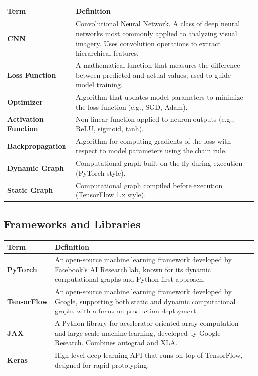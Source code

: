\documentclass[11pt]{article}
\begin{document}
\begin{longtable}{|p{}|p{}|}
\hline
\textbf{Term} & \textbf{Definition} \\
\hline
\endhead
\textbf{CNN} & Convolutional Neural Network. A class of deep neural networks most commonly applied to analyzing visual imagery. Uses convolution operations to extract hierarchical features. \\
\hline
\textbf{Loss Function} & A mathematical function that measures the difference between predicted and actual values, used to guide model training. \\
\hline
\textbf{Optimizer} & Algorithm that updates model parameters to minimize the loss function (e.g., SGD, Adam). \\
\hline
\textbf{Activation Function} & Non-linear function applied to neuron outputs (e.g., ReLU, sigmoid, tanh). \\
\hline
\textbf{Backpropagation} & Algorithm for computing gradients of the loss with respect to model parameters using the chain rule. \\
\hline
\textbf{Dynamic Graph} & Computational graph built on-the-fly during execution (PyTorch style). \\
\hline
\textbf{Static Graph} & Computational graph compiled before execution (TensorFlow 1.x style). \\
\hline
\end{longtable}

\subsection{Frameworks and Libraries}

\begin{longtable}{|p{}|p{}|}
\hline
\textbf{Term} & \textbf{Definition} \\
\hline
\endhead
\textbf{PyTorch} & An open-source machine learning framework developed by Facebook's AI Research lab, known for its dynamic computational graphs and Python-first approach. \\
\hline
\textbf{TensorFlow} & An open-source machine learning framework developed by Google, supporting both static and dynamic computational graphs with a focus on production deployment. \\
\hline
\textbf{JAX} & A Python library for accelerator-oriented array computation and large-scale machine learning, developed by Google Research. Combines autograd and XLA. \\
\hline
\textbf{Keras} & High-level deep learning API that runs on top of TensorFlow, designed for rapid prototyping. \\
\hline
\end{longtable}
\end{document}
